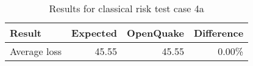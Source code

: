 \begin{table}[htbp]

\centering
\begin{tabular}{ l r r r }

\hline
\rowcolor{anti-flashwhite}
\bf{Result} & \bf{Expected} & \bf{OpenQuake} & \bf{Difference}\\
\hline
Average loss & 45.55 & 45.55 & 0.00\% \\
\hline
\end{tabular}

\caption{Results for classical risk test case 4a}
\label{tab:result-cr-4a}
\end{table}